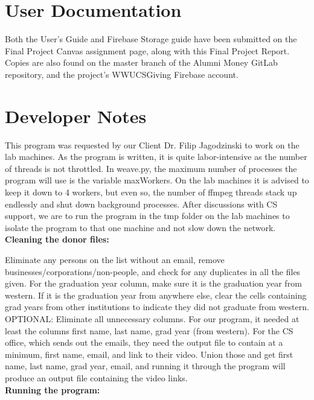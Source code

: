 \documentclass{article}
\begin{document}
\section{User Documentation} 
Both the User's Guide and Firebase Storage guide have been submitted on the Final Project Canvas assignment page, 
along with this Final Project Report. Copies are also found on the master branch of the Alumni Money GitLab repository, 
and the project's WWUCSGiving Firebase account.

\section{Developer Notes}

This program was requested by our Client Dr. Filip Jagodzinski to work on the lab machines. As the program is written, it is quite labor-intensive as the number of threads is not throttled. In weave.py, the maximum number of processes the program will use is the variable maxWorkers. On the lab machines it is advised to keep it down to 4 workers, but even so, the number of ffmpeg threads stack up endlessly and shut down background processes. After discussions with CS support, we are to run the program in the tmp folder on the lab machines to isolate the program to that one machine and not slow down the network.\\
\textbf{Cleaning the donor files:}

Eliminate any persons on the list without an email, remove businesses/corporations/non-people, and check for any duplicates in all the files given. For the graduation year column, make sure it is the graduation year from western. If it is the graduation year from anywhere else, clear the cells containing grad years from other institutions to indicate they did not graduate from western. OPTIONAL: Eliminate all unnecessary columns. For our program, it needed at least the columns first name, last name, grad year (from western). For the CS office, which sends out the emails, they need the output file to contain at a minimum, first name, email, and link to their video. Union those and get first name, last name, grad year, email, and running it through the program will produce an output file containing the video links.\\
\textbf{Running the program:}
\end{document}
